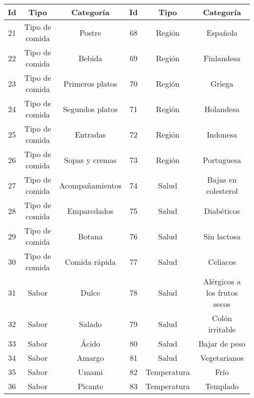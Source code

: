 \begin{table}
	\begin{center}
		\begin{tabular}{ | c | c | c | c | c | c |}
			\toprule
			Id & Tipo           & Categoría        & Id & Tipo        & Categoría                    \\
			\midrule
			21 & Tipo de comida & Postre            & 68 & Región     & Española                     \\
			\midrule
			22 & Tipo de comida & Bebida            & 69 & Región     & Finlandesa                    \\
			\midrule
			23 & Tipo de comida & Primeros platos   & 70 & Región     & Griega                        \\
			\midrule
			24 & Tipo de comida & Segundos platos   & 71 & Región     & Holandesa                     \\
			\midrule
			25 & Tipo de comida & Entradas          & 72 & Región     & Indonesa                      \\
			\midrule
			26 & Tipo de comida & Sopas y cremas    & 73 & Región     & Portuguesa                    \\
			\midrule
			27 & Tipo de comida & Acompañamientos  & 74 & Salud       & Bajas en colesterol           \\
			\midrule
			28 & Tipo de comida & Emparedados       & 75 & Salud       & Diabéticos                   \\
			\midrule
			29 & Tipo de comida & Botana            & 76 & Salud       & Sin lactosa                   \\
			\midrule
			30 & Tipo de comida & Comida rápida    & 77 & Salud       & Celiacos                      \\
			\midrule
			31 & Sabor          & Dulce             & 78 & Salud       & Alérgicos a los frutos secos \\
			\midrule
			32 & Sabor          & Salado            & 79 & Salud       & Colón irritable              \\
			\midrule
			33 & Sabor          & Ácido            & 80 & Salud       & Bajar de peso                 \\
			\midrule
			34 & Sabor          & Amargo            & 81 & Salud       & Vegetarianos                  \\
			\midrule
			35 & Sabor          & Umami             & 82 & Temperatura & Frío                         \\
			\midrule
			36 & Sabor          & Picante           & 83 & Temperatura & Templado                      \\

\end{tabular}
\end{center}
\end{table}

